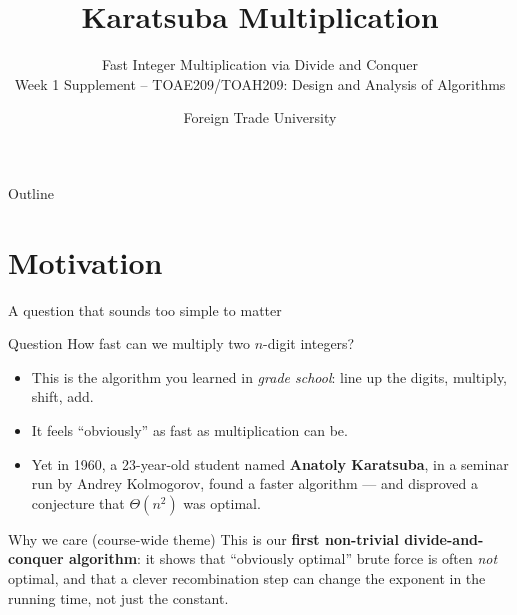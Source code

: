 \documentclass[11pt,aspectratio=169]{beamer}
\title{Karatsuba Multiplication}
\subtitle{Fast Integer Multiplication via Divide and Conquer\\
\small Week 1 Supplement -- TOAE209/TOAH209: Design and Analysis of Algorithms}
\author{Foreign Trade University}
\date{}
\begin{document}
\begin{frame}
  \titlepage
\end{frame}

\begin{frame}{Outline}
  \tableofcontents
\end{frame}

\section{Motivation}

\begin{frame}{A question that sounds too simple to matter}
  \begin{block}{Question}
    How fast can we multiply two $n$-digit integers?
  \end{block}
  \vspace{0.5em}
  \begin{itemize}
    \item This is the algorithm you learned in \emph{grade school}: line up the digits,
    multiply, shift, add.
    \item It feels ``obviously'' as fast as multiplication can be.
    \item Yet in 1960, a 23-year-old student named \textbf{Anatoly Karatsuba}, in a seminar
    run by Andrey Kolmogorov, found a faster algorithm --- and disproved a conjecture that
    $\Theta(n^2)$ was optimal.
  \end{itemize}
  \vspace{0.5em}
  \begin{alertblock}{Why we care (course-wide theme)}
    This is our \textbf{first non-trivial divide-and-conquer algorithm}: it shows that
    ``obviously optimal'' brute force is often \emph{not} optimal, and that a clever
    recombination step can change the exponent in the running time, not just the constant.
  \end{alertblock}
\end{frame}
\end{document}
